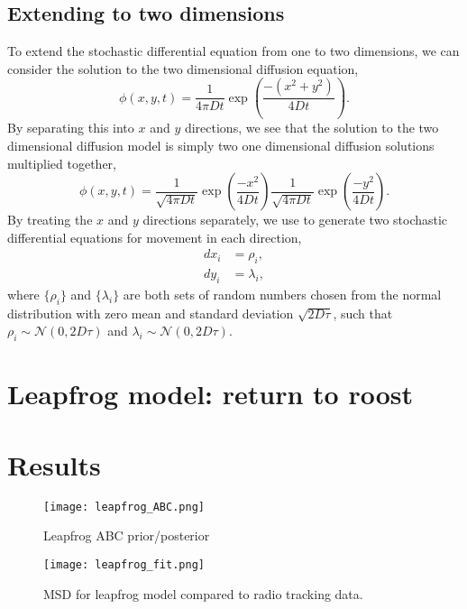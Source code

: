 \subsection{Extending to two dimensions}

To extend the stochastic differential equation from one to two dimensions, we can consider the solution to the two dimensional diffusion equation,
%
\begin{equation}
\phi(x,y,t) = \frac{1}{4\pi Dt}\exp \left(\frac{-(x^2+y^2)}{4Dt} \right) .
\label{eqn:diffusion_solution2d}
\end{equation}
%
By separating this into $x$ and $y$ directions, we see that the solution to the two dimensional diffusion model is simply two one dimensional diffusion solutions multiplied together,
\begin{equation}
\phi(x,y,t) = \frac{1}{\sqrt{4\pi Dt}}\exp \left(\frac{-x^2}{4Dt} \right) \frac{1}{\sqrt{4\pi Dt}}\exp \left(\frac{-y^2}{4Dt} \right) .
\end{equation}
%
By treating the $x$ and $y$ directions separately, we use  to generate two stochastic differential equations for movement in each direction,
\begin{align}
%
dx_i &= \rho_i, \\
dy_i &= \lambda_i,
\end{align}
%
where $\{\rho_i\}$ and $\{\lambda_i\}$ are both sets of random numbers chosen from the normal distribution with zero mean and standard deviation $\sqrt{2D\tau}$, such that $\rho_i \sim \mathcal{N}(0,2D\tau)$ and $\lambda_i \sim \mathcal{N}(0,2D\tau)$.

	\section{Leapfrog model: return to roost}

\section{Results}

\begin{figure} [h]
    \centering
        \texttt{[image: leapfrog\_ABC.png]}
        \caption{Leapfrog ABC prior/posterior        }
    \label{fig:leapfrog_abc}
\end{figure}

\begin{figure} [h]
    \centering
        \texttt{[image: leapfrog\_fit.png]}
        \caption{MSD for leapfrog model compared to radio tracking data.
        }
    \label{fig:leapfrog_fit}
\end{figure}
